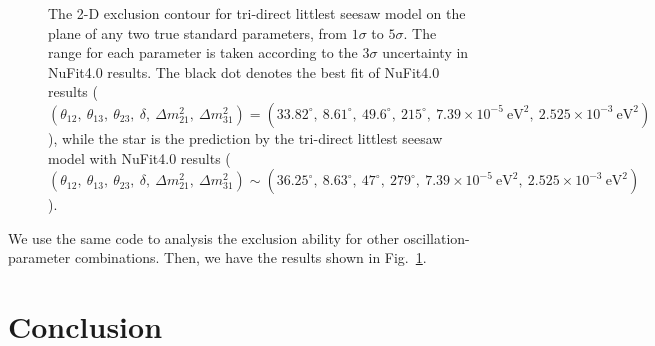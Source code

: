 \documentclass[a4paper,11pt]{article}
\begin{document}
\begin{figure}[!h]
 \caption{\label{fig:SR_2D}The 2-D exclusion contour for tri-direct littlest seesaw model on the plane of any two true standard parameters, from $1\sigma$ to $5\sigma$. The range for each parameter is taken according to the $3\sigma$ uncertainty in NuFit4.0 results. The black dot denotes the best fit of NuFit4.0 results ($(\theta_{12},~\theta_{13},~\theta_{23},~\delta,~\Delta m_{21}^2,~\Delta m_{31}^2)=(33.82^\circ,~8.61^\circ,~49.6^\circ,~215^\circ,~7.39\times10^{-5}~\text{eV}^2,~2.525\times10^{-3}~\text{eV}^2)$), while the star is the prediction by the tri-direct littlest seesaw model with NuFit4.0 results ($(\theta_{12},~\theta_{13},~\theta_{23},~\delta,~\Delta m_{21}^2,~\Delta m_{31}^2)\sim(36.25^\circ,~8.63^\circ,~47^\circ,~279^\circ,~7.39\times10^{-5}~\text{eV}^2,~2.525\times10^{-3}~\text{eV}^2)$).}
\end{figure}

We use the same code to analysis the exclusion ability for other oscillation-parameter combinations. Then, we have the results shown in Fig.~\ref{fig:SR_2D}.

\section{Conclusion}



\end{document}
